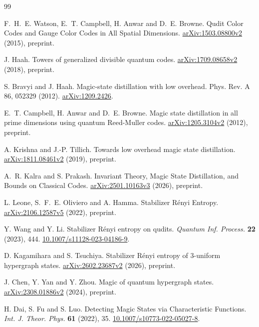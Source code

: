 \begin{thebibliography}{99}
\raggedright

 F.~H.~E. Watson, E.~T. Campbell, H. Anwar and D.~E. Browne. Qudit Color Codes and Gauge Color Codes in All Spatial Dimensions. \href{https://arxiv.org/abs/1503.08800v2}{arXiv:1503.08800v2} (2015), preprint.

 J. Haah. Towers of generalized divisible quantum codes. \href{https://arxiv.org/abs/1709.08658v2}{arXiv:1709.08658v2} (2018), preprint.

 S. Bravyi and J. Haah. Magic-state distillation with low overhead. Phys. Rev. A 86, 052329 (2012). \href{https://arxiv.org/abs/1209.2426}{arXiv:1209.2426}.

 E.~T. Campbell, H. Anwar and D.~E. Browne. Magic state distillation in all prime dimensions using quantum Reed-Muller codes. \href{https://arxiv.org/abs/1205.3104v2}{arXiv:1205.3104v2} (2012), preprint.

 A. Krishna and J.-P. Tillich. Towards low overhead magic state distillation. \href{https://arxiv.org/abs/1811.08461v2}{arXiv:1811.08461v2} (2019), preprint.

 A.~R. Kalra and S. Prakash. Invariant Theory, Magic State Distillation, and Bounds on Classical Codes. \href{https://arxiv.org/abs/2501.10163v3}{arXiv:2501.10163v3} (2026), preprint.

 L. Leone, S.~F.~E. Oliviero and A. Hamma. Stabilizer R\'enyi Entropy. \href{https://arxiv.org/abs/2106.12587v5}{arXiv:2106.12587v5} (2022), preprint.

 Y. Wang and Y. Li. Stabilizer R\'enyi entropy on qudits. \emph{Quantum Inf. Process.} \textbf{22} (2023), 444. \href{https://doi.org/10.1007/s11128-023-04186-9}{10.1007/s11128-023-04186-9}.

 D. Kagamihara and S. Tsuchiya. Stabilizer R\'enyi entropy of 3-uniform hypergraph states. \href{https://arxiv.org/abs/2602.23687v2}{arXiv:2602.23687v2} (2026), preprint.

 J. Chen, Y. Yan and Y. Zhou. Magic of quantum hypergraph states. \href{https://arxiv.org/abs/2308.01886v2}{arXiv:2308.01886v2} (2024), preprint.

 H. Dai, S. Fu and S. Luo. Detecting Magic States via Characteristic Functions. \emph{Int. J. Theor. Phys.} \textbf{61} (2022), 35. \href{https://doi.org/10.1007/s10773-022-05027-8}{10.1007/s10773-022-05027-8}.


\end{thebibliography}
